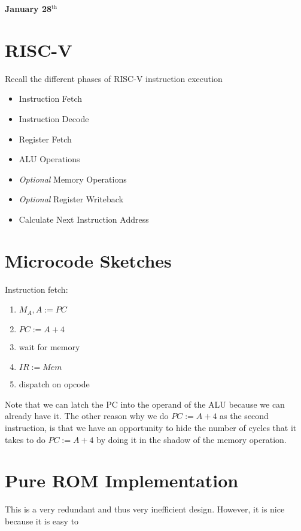 
\setcounter{section}{0}

\textbf{January 28$^{\text{th}}$}

\section{RISC-V}

Recall the different phases of RISC-V instruction execution

\begin{itemize}
    \item Instruction Fetch
    \item Instruction Decode
    \item Register Fetch
    \item ALU Operations
    \item \textit{Optional} Memory Operations
    \item \textit{Optional} Register Writeback
    \item Calculate Next Instruction Address
\end{itemize}

\section{Microcode Sketches}

Instruction fetch:

\begin{enumerate}
    \item $M_A, A := PC$
    \item $PC := A + 4$
    \item wait for memory
    \item $IR := Mem$
    \item dispatch on opcode
\end{enumerate}

Note that we can latch the PC into the operand of the ALU because we can already have it.
The other reason why we do $PC := A+4$ as the second instruction, is that we have an opportunity to hide the number of cycles that it takes to do $PC := A +4$ by doing it in the shadow of the memory operation.

\section{Pure ROM Implementation}
This is a very redundant and thus very inefficient design.
However, it is nice because it is easy to 

